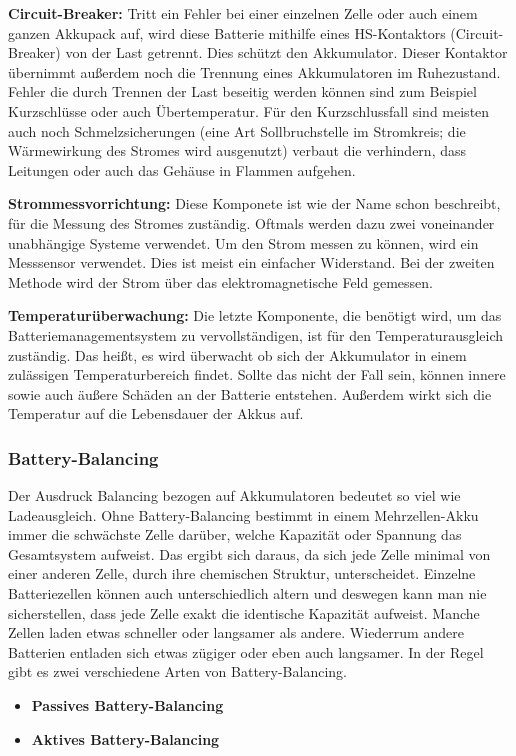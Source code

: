 \textbf{Circuit-Breaker:}
Tritt ein Fehler bei einer einzelnen Zelle oder auch einem ganzen Akkupack auf, wird diese Batterie mithilfe eines HS-Kontaktors (Circuit-Breaker) von der Last getrennt. Dies schützt den Akkumulator. Dieser Kontaktor übernimmt außerdem noch die Trennung eines Akkumulatoren im Ruhezustand. Fehler die durch Trennen der Last beseitig werden können sind zum Beispiel Kurzschlüsse oder auch Übertemperatur. Für den Kurzschlussfall sind meisten auch noch Schmelzsicherungen (eine Art Sollbruchstelle im Stromkreis; die Wärmewirkung des Stromes wird ausgenutzt) verbaut die verhindern, dass Leitungen oder auch das Gehäuse in Flammen aufgehen.

\textbf{Strommessvorrichtung:}
Diese Komponete ist wie der Name schon beschreibt, für die Messung des Stromes zuständig. Oftmals werden dazu zwei voneinander unabhängige Systeme verwendet. Um den Strom messen zu können, wird ein Messsensor verwendet. Dies ist meist ein einfacher Widerstand. Bei der zweiten Methode wird der Strom über das elektromagnetische Feld gemessen.

\textbf{Temperaturüberwachung:}
Die letzte Komponente, die benötigt wird, um das Batteriemanagementsystem zu vervollständigen, ist für den Temperaturausgleich zuständig. Das heißt, es wird überwacht ob sich der Akkumulator in einem zulässigen Temperaturbereich findet. Sollte das nicht der Fall sein, können innere sowie auch äußere Schäden an der Batterie entstehen. Außerdem wirkt sich die Temperatur auf die Lebensdauer der Akkus auf.
\newpage

\subsubsection{Battery-Balancing}
Der Ausdruck Balancing bezogen auf Akkumulatoren bedeutet so viel wie Ladeausgleich. Ohne Battery-Balancing bestimmt in einem Mehrzellen-Akku immer die schwächste Zelle darüber, welche Kapazität oder Spannung das Gesamtsystem aufweist. Das ergibt sich daraus, da sich jede Zelle minimal von einer anderen Zelle, durch ihre chemischen Struktur, unterscheidet. Einzelne Batteriezellen können auch unterschiedlich altern und deswegen kann man nie sicherstellen, dass jede Zelle exakt die identische Kapazität aufweist. Manche Zellen laden etwas schneller oder langsamer als andere. Wiederrum andere Batterien entladen sich etwas zügiger oder eben auch langsamer. In der Regel gibt es zwei verschiedene Arten von Battery-Balancing.
\begin{itemize}
\item \textbf{Passives Battery-Balancing} \medskip\\
\item \textbf{Aktives Battery-Balancing} \medskip\\
\end{itemize}


